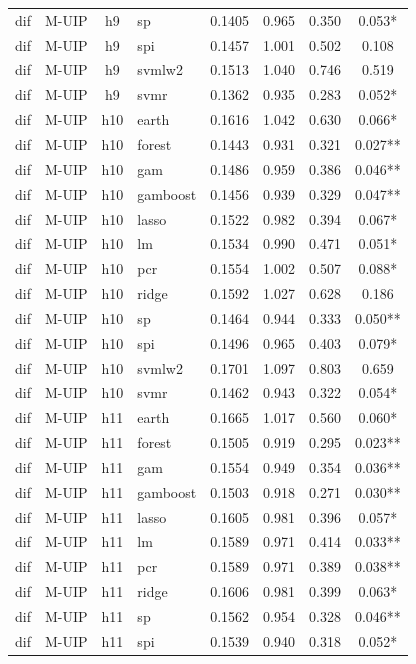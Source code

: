 \begin{ThreePartTable}
\begin{longtable}[t]{llclcccc}
dif & M-UIP & h9 & sp & 0.1405 & 0.965 & 0.350 & 0.053*\\
dif & M-UIP & h9 & spi & 0.1457 & 1.001 & 0.502 & 0.108\\
dif & M-UIP & h9 & svmlw2 & 0.1513 & 1.040 & 0.746 & 0.519\\
dif & M-UIP & h9 & svmr & 0.1362 & 0.935 & 0.283 & 0.052*\\
\addlinespace
dif & M-UIP & h10 & earth & 0.1616 & 1.042 & 0.630 & 0.066*\\
dif & M-UIP & h10 & forest & 0.1443 & 0.931 & 0.321 & 0.027**\\
dif & M-UIP & h10 & gam & 0.1486 & 0.959 & 0.386 & 0.046**\\
dif & M-UIP & h10 & gamboost & 0.1456 & 0.939 & 0.329 & 0.047**\\
dif & M-UIP & h10 & lasso & 0.1522 & 0.982 & 0.394 & 0.067*\\
dif & M-UIP & h10 & lm & 0.1534 & 0.990 & 0.471 & 0.051*\\
dif & M-UIP & h10 & pcr & 0.1554 & 1.002 & 0.507 & 0.088*\\
dif & M-UIP & h10 & ridge & 0.1592 & 1.027 & 0.628 & 0.186\\
dif & M-UIP & h10 & sp & 0.1464 & 0.944 & 0.333 & 0.050**\\
dif & M-UIP & h10 & spi & 0.1496 & 0.965 & 0.403 & 0.079*\\
dif & M-UIP & h10 & svmlw2 & 0.1701 & 1.097 & 0.803 & 0.659\\
dif & M-UIP & h10 & svmr & 0.1462 & 0.943 & 0.322 & 0.054*\\
\addlinespace
dif & M-UIP & h11 & earth & 0.1665 & 1.017 & 0.560 & 0.060*\\
dif & M-UIP & h11 & forest & 0.1505 & 0.919 & 0.295 & 0.023**\\
dif & M-UIP & h11 & gam & 0.1554 & 0.949 & 0.354 & 0.036**\\
dif & M-UIP & h11 & gamboost & 0.1503 & 0.918 & 0.271 & 0.030**\\
dif & M-UIP & h11 & lasso & 0.1605 & 0.981 & 0.396 & 0.057*\\
dif & M-UIP & h11 & lm & 0.1589 & 0.971 & 0.414 & 0.033**\\
dif & M-UIP & h11 & pcr & 0.1589 & 0.971 & 0.389 & 0.038**\\
dif & M-UIP & h11 & ridge & 0.1606 & 0.981 & 0.399 & 0.063*\\
dif & M-UIP & h11 & sp & 0.1562 & 0.954 & 0.328 & 0.046**\\
dif & M-UIP & h11 & spi & 0.1539 & 0.940 & 0.318 & 0.052*\\

\end{longtable}
\end{ThreePartTable}

